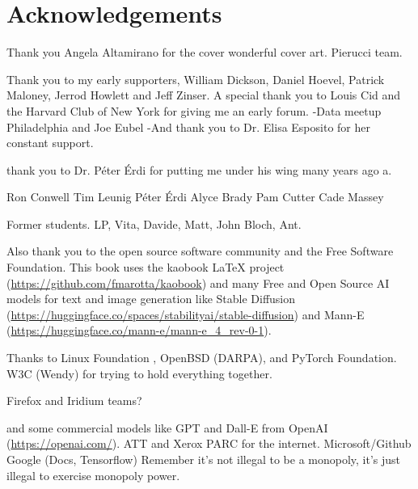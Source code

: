 \let\cleardoublepage\clearpage
\chapter*{Acknowledgements}

Thank you Angela Altamirano for the cover wonderful cover art. Pierucci team. 

Thank you to my early supporters, William Dickson, Daniel Hoevel, Patrick Maloney, Jerrod Howlett and Jeff Zinser. A special thank you to Louis Cid and the Harvard Club of New York for giving me an early forum. 
-Data meetup Philadelphia and Joe Eubel
-And thank you to Dr. Elisa Esposito for her constant support. 

thank you to Dr. Péter Érdi for putting me under his wing many years ago a.

Ron Conwell
Tim Leunig
Péter Érdi
Alyce Brady
Pam Cutter
Cade Massey

Former students.
LP, Vita, Davide, Matt, John Bloch, Ant.

Also thank you to the open source software community and the Free Software Foundation. This book uses the kaobook LaTeX project (\url{https://github.com/fmarotta/kaobook}) and  many Free and Open Source AI  models for text and image generation like Stable Diffusion (\url{https://huggingface.co/spaces/stabilityai/stable-diffusion}) and Mann-E (\url{https://huggingface.co/mann-e/mann-e_4_rev-0-1}). 

Thanks to Linux Foundation , OpenBSD (DARPA), and PyTorch Foundation. W3C (Wendy) for trying to hold everything together.  

Firefox and Iridium teams?

and some commercial models like GPT and Dall-E from OpenAI (\url{https://openai.com/}).
ATT and Xerox PARC for the internet.
Microsoft/Github
Google (Docs, Tensorflow)
Remember it's not illegal to be a monopoly, it's just illegal to exercise monopoly power.
